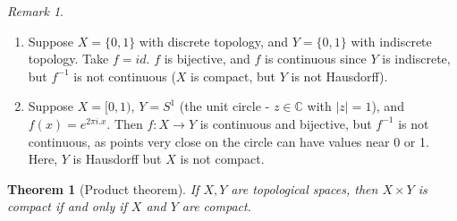 \documentclass{article}
\theoremstyle{definition}
\theoremstyle{plain}%
\newtheorem{thm}{Theorem}[section]
\theoremstyle{remark}
\newtheorem*{rem}{Remark}
\begin{document}
\begin{rem}
    \begin{enumerate}
        \item Suppose $X = \{0,1\}$ with discrete topology, and $Y = \{0,1\}$ with indiscrete topology. Take $f = id$. $f$ is bijective, and $f$ is continuous since $Y$ is indiscrete, but $f^{-1}$ is not continuous ($X$ is compact, but $Y$ is not Hausdorff).
        \item Suppose $X = [0,1)$, $Y = S^1$ (the unit circle - $z \in \mathbb{C}$ with $|z| = 1$), and $f(x) = e^{2\pi i . x}$. Then $f: X \to Y$ is continuous and bijective, but $f^{-1}$ is not continuous, as points very close on the circle can have values near 0 or 1. Here, $Y$ is Hausdorff but $X$ is not compact.
    \end{enumerate}
\end{rem}

\begin{thm}[Product theorem]
    If $X,Y$ are topological spaces, then $X \times Y$ is compact if and only if $X$ and $Y$ are compact.
\end{thm}
\end{document}
